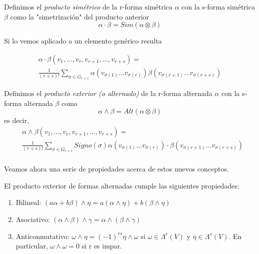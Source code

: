 \documentclass[../VD.tex]{subfiles}
\begin{document}
\begin{definition}
Definimos el \emph{producto simétrico} de la r-forma simétrica \( \alpha \) con la s-forma simétrica \( \beta \) como la "simetrización" del producto anterior
\[
\alpha\cdot\beta=Sim(\alpha\otimes\beta)
\]
\end{definition}

Si lo vemos aplicado a un elemento genérico resulta

\begin{align*}
  \alpha \cdot \beta(v_1,\dots,v_r,v_{r+1},\dots,v_{r+s})
  = \\
  \frac{1}{(r+s)!}
  \sum_{\sigma\in G_{r+s}}
  \alpha(v_{\sigma(1)}\dots v_{\sigma(r)})
  \beta(v_{\sigma(r+1)}\dots v_{\sigma(r+s)})
\end{align*}

\begin{definition}
Definimos el \emph{producto exterior (o alternado)} de la r-forma alternada \( \alpha \) con la s-forma alternada \( \beta \) como
\[
\alpha\wedge\beta=Alt(\alpha\otimes\beta)
\]
es decir,
\begin{align*}
&\alpha\wedge\beta(v_1,\ldots,v_r,v_{r+1},\ldots,v_{r+s})=\\
  &\frac{1}{(r+s)!}
    \sum_{\sigma\in G_{r+s}}
    Signo(\sigma)
    \alpha(v_{\sigma(1)} \ldots v_{\sigma(r)})
    \cdot
    \beta(v_{\sigma(r+1)}\ldots v_{\sigma(r+s)})\\
\end{align*}
\end{definition}

Veamos ahora una serie de propiedades acerca de estos nuevos conceptos.

\begin{proposition}\label{prop:ext-proper}
El producto exterior de formas alternadas cumple las siguientes propiedades:
\begin{enumerate}
\item Bilineal: \( (a\alpha+b\beta)\wedge \eta=a(\alpha\wedge\eta)+b(\beta\wedge\eta) \)
\item Asociativo: \( (\alpha\wedge\beta)\wedge \gamma=\alpha\wedge(\beta\wedge\gamma) \)
\item Anticonmutativo: \( \omega\wedge\eta=(-1)^{rs}\eta\wedge\omega \) si \( \omega\in \Lambda^r(V) \) y \( \eta\in \Lambda^s(V) \). En particular, \( \omega\wedge\omega=0 \) si r es impar.
\end{enumerate}
\end{proposition}
\end{document}
